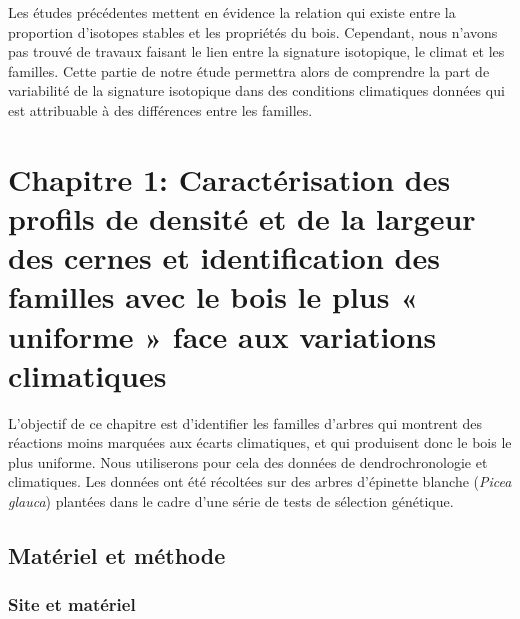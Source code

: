 \documentclass[a4paper,12pt]{report}
\begin{document}
\begin{itemize}
	Les études précédentes mettent en évidence la relation qui existe entre la proportion d'isotopes stables et les propriétés du bois. Cependant, nous n'avons pas trouvé de travaux faisant le lien entre la signature isotopique, le climat et les familles. Cette partie de notre étude permettra alors de comprendre la part de variabilité de la signature isotopique dans des conditions climatiques données qui est attribuable à des différences entre les familles. 
	
	
\end{itemize} 


\chapter{Chapitre 1: Caractérisation des profils de densité et de la largeur des cernes et identification des familles avec le bois le plus « uniforme » face aux variations climatiques}


L'objectif de ce chapitre est d'identifier les familles d'arbres qui montrent des réactions moins marquées aux écarts climatiques, et qui produisent donc le bois le plus uniforme. Nous utiliserons pour cela des données de dendrochronologie et climatiques. Les données ont été récoltées sur des arbres d'épinette blanche (\textit{Picea glauca}) plantées dans le cadre d'une série de tests de sélection génétique. 


\section{Matériel et méthode}

\subsection*{Site et matériel}\label{matériel}
\end{document}
